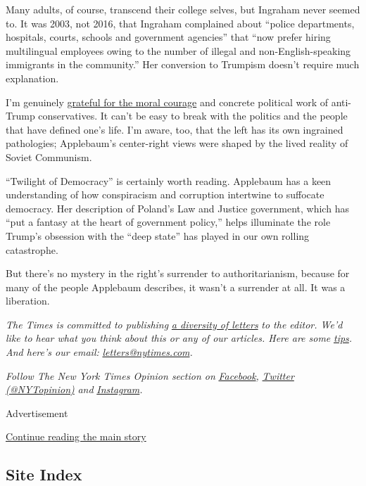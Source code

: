 Many adults, of course, transcend their college selves, but Ingraham
never seemed to. It was 2003, not 2016, that Ingraham complained about
``police departments, hospitals, courts, schools and government
agencies'' that ``now prefer hiring multilingual employees owing to the
number of illegal and non-English-speaking immigrants in the
community.'' Her conversion to Trumpism doesn't require much
explanation.

I'm genuinely
\href{https://www.nytimes.com/2019/10/28/opinion/trump-human-scum-tweet.html}{grateful
for the moral courage} and concrete political work of anti-Trump
conservatives. It can't be easy to break with the politics and the
people that have defined one's life. I'm aware, too, that the left has
its own ingrained pathologies; Applebaum's center-right views were
shaped by the lived reality of Soviet Communism.

``Twilight of Democracy'' is certainly worth reading. Applebaum has a
keen understanding of how conspiracism and corruption intertwine to
suffocate democracy. Her description of Poland's Law and Justice
government, which has ``put a fantasy at the heart of government
policy,'' helps illuminate the role Trump's obsession with the ``deep
state'' has played in our own rolling catastrophe.

But there's no mystery in the right's surrender to authoritarianism,
because for many of the people Applebaum describes, it wasn't a
surrender at all. It was a liberation.

\emph{The Times is committed to publishing}
\href{https://www.nytimes.com/2019/01/31/opinion/letters/letters-to-editor-new-york-times-women.html}{\emph{a
diversity of letters}} \emph{to the editor. We'd like to hear what you
think about this or any of our articles. Here are some}
\href{https://help.nytimes.com/hc/en-us/articles/115014925288-How-to-submit-a-letter-to-the-editor}{\emph{tips}}\emph{.
And here's our email:}
\href{mailto:letters@nytimes.com}{\emph{letters@nytimes.com}}\emph{.}

\emph{Follow The New York Times Opinion section on}
\href{https://www.facebook.com/nytopinion}{\emph{Facebook}}\emph{,}
\href{http://twitter.com/NYTOpinion}{\emph{Twitter (@NYTopinion)}}
\emph{and}
\href{https://www.instagram.com/nytopinion/}{\emph{Instagram}}\emph{.}

Advertisement

\protect\hyperlink{after-bottom}{Continue reading the main story}

\hypertarget{site-index}{%
\subsection{Site Index}\label{site-index}}

